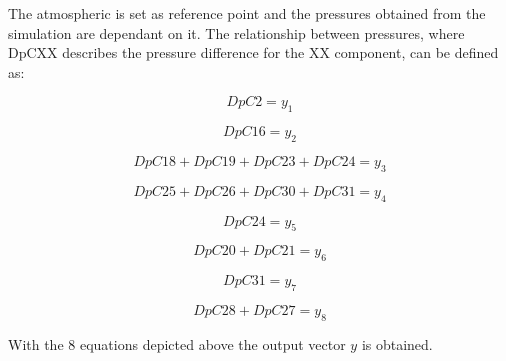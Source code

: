 The atmospheric is set as reference point and the pressures obtained from the simulation are dependant on it. The relationship between pressures, where DpCXX describes
the pressure difference for the XX component, can be defined as:

\vspace{4mm}
\begin{equation}
    DpC2 = y_1
\end{equation}

\vspace{4mm}
\begin{equation}
  DpC16 = y_2
\end{equation}

\vspace{4mm}
\begin {equation}
    DpC18 + DpC19 + DpC23 + DpC24 = y_3
\end{equation}

\vspace{4mm}
\begin {equation}
    DpC25 + DpC26 + DpC30 + DpC31 = y_4
\end{equation}

\vspace{4mm}
\begin {equation}
    DpC24 = y_5
\end{equation}

\vspace{4mm}
\begin {equation}
    DpC20 + DpC21= y_6
\end{equation}

\vspace{4mm}
\begin {equation}
    DpC31 = y_7
\end{equation}

\vspace{4mm}
\begin {equation}
    DpC28 + DpC27 = y_8
\end{equation}

With the $8$ equations depicted above the output vector $y$ is obtained. 